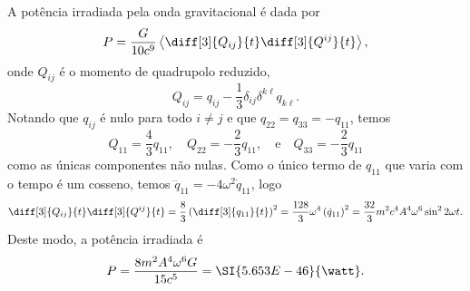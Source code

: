 A potência irradiada pela onda gravitacional é dada por
\begin{equation*}
    P = \frac{G}{10c^9} \left\langle \diff[3]{Q_{ij}}{t}\diff[3]{Q^{ij}}{t}\right\rangle,
\end{equation*}
onde \(Q_{ij}\) é o momento de quadrupolo reduzido,
\begin{equation*}
    Q_{ij} = q_{ij} - \frac13 \delta_{ij} \delta^{k\ell} q_{k\ell}.
\end{equation*}
Notando que \(q_{ij}\) é nulo para todo \(i \neq j\) e que \(q_{22} = q_{33} = -q_{11}\), temos
\begin{equation*}
    Q_{11} = \frac43 q_{11}, \quad Q_{22} = - \frac23 q_{11}, \quad\text{e}\quad Q_{33} = -\frac23 q_{11}
\end{equation*}
como as únicas componentes não nulas. Como o único termo de \(q_{11}\) que varia com o tempo é um cosseno, temos \(\dddot{q}_{11} = -4 \omega^2 \dot{q}_{11}\), logo
\begin{equation*}
    \diff[3]{Q_{ij}}{t}\diff[3]{Q^{ij}}{t} = \frac83 \left(\diff[3]{q_{11}}{t}\right)^2 = \frac{128}{3} \omega^4 \left(\dot{q}_{11}\right)^2 = \frac{32}{3} m^2c^4 A^4 \omega^6 \sin^2 2\omega t.
\end{equation*}
Deste modo, a potência irradiada é
\begin{equation*}
    P = \frac{8m^2 A^4 \omega^6 G}{15c^5} = \SI{5.653E-46}{\watt}.
\end{equation*}
